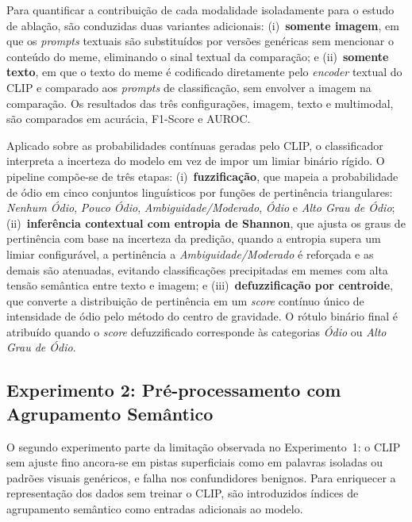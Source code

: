 Para quantificar a contribuição de cada modalidade isoladamente para o estudo de ablação, são conduzidas duas variantes adicionais: (i)~\textbf{somente imagem}, em que os \textit{prompts} textuais são substituídos por versões genéricas sem mencionar o conteúdo do meme, eliminando o sinal textual da comparação; e (ii)~\textbf{somente texto}, em que o texto do meme é codificado diretamente pelo \textit{encoder} textual do CLIP e comparado aos \textit{prompts} de classificação, sem envolver a imagem na comparação. Os resultados das três configurações, imagem, texto e multimodal, são comparados em acurácia, F1-Score e AUROC.

Aplicado sobre as probabilidades contínuas geradas pelo CLIP, o classificador interpreta a incerteza do modelo em vez de impor um limiar binário rígido. O pipeline compõe-se de três etapas: (i)~\textbf{fuzzificação}, que mapeia a probabilidade de ódio em cinco conjuntos linguísticos por funções de pertinência triangulares: \textit{Nenhum Ódio}, \textit{Pouco Ódio}, \textit{Ambiguidade/Moderado}, \textit{Ódio} e \textit{Alto Grau de Ódio}; (ii)~\textbf{inferência contextual com entropia de Shannon}, que ajusta os graus de pertinência com base na incerteza da predição, quando a entropia supera um limiar configurável, a pertinência a \textit{Ambiguidade/Moderado} é reforçada e as demais são atenuadas, evitando classificações precipitadas em memes com alta tensão semântica entre texto e imagem; e (iii)~\textbf{defuzzificação por centroide}, que converte a distribuição de pertinência em um \textit{score} contínuo único de intensidade de ódio pelo método do centro de gravidade. O rótulo binário final é atribuído quando o \textit{score} defuzzificado corresponde às categorias \textit{Ódio} ou \textit{Alto Grau de Ódio}.

\subsection{Experimento 2: Pré-processamento com Agrupamento Semântico}

O segundo experimento parte da limitação observada no Experimento~1: o CLIP sem ajuste fino ancora-se em pistas superficiais como em palavras isoladas ou padrões visuais genéricos, e falha nos confundidores benignos. Para enriquecer a representação dos dados sem treinar o CLIP, são introduzidos índices de agrupamento semântico como entradas adicionais ao modelo.

